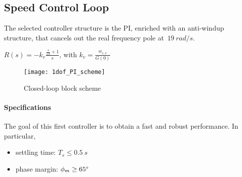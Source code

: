 \newpage
\subsection{Speed Control Loop}
The selected controller structure is the PI, enriched with an anti-windup structure, that cancels out the real frequency pole at~$19\ rad/s$.
\begin{center}
$ R(s) = -k_v \frac{\frac{s}{19}+1}{s} $,
with \quad
$ k_{v} = \frac{w_{c,v}}{G(0)} $
\end{center}
\begin{figure*}[h]
	\centering
	\texttt{[image: 1dof\_PI\_scheme]}
	\caption{Closed-loop block scheme}
\end{figure*}

\paragraph{Specifications}
The goal of this first controller is to obtain a fast and robust performance. In particular,
\begin{itemize}
	\item settling time: $T_s \leq 0.5\ s$
	\item phase margin: $\phi_m \geq 65\degree$
\end{itemize}

